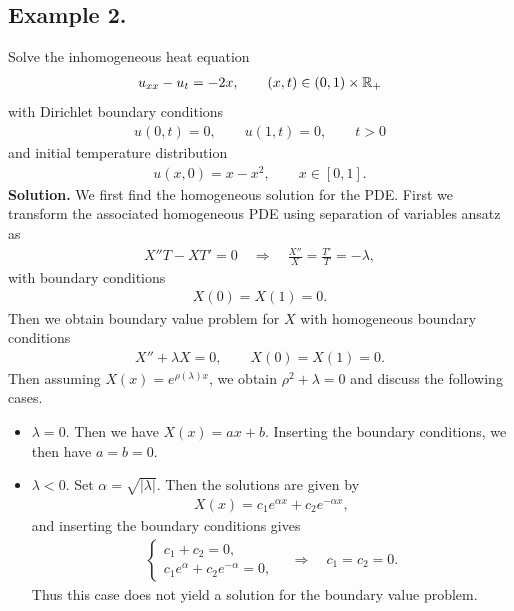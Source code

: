 \documentclass[12pt, a4paper]{article}
\begin{document}
\begin{spacing}{1.1}
\section*{Example 2.}

Solve the inhomogeneous heat equation
\begin{align*}
u_{xx} - u_t = -2x, \qquad (x, t)\in (0, 1)\times \mathbb{R}_{+}
\end{align*}
with Dirichlet boundary conditions
\begin{align*}
u(0, t) = 0, \qquad u(1, t) = 0, \qquad t > 0
\end{align*}
and initial temperature distribution
\begin{align*}
u(x, 0) = x - x^2, \qquad x\in [0, 1].
\end{align*}
\textbf{Solution.} We first find the homogeneous solution for the PDE. First we transform the associated homogeneous PDE using separation of variables ansatz as
\begin{align*}
X''T - XT' = 0\quad\Rightarrow\quad \frac{X''}{X} = \frac{T'}{T} = -\lambda,
\end{align*}
with boundary conditions
\begin{align*}
X(0) = X(1) = 0.
\end{align*}
Then we obtain boundary value problem for $X$ with homogeneous boundary conditions
\begin{align*}
X'' + \lambda X = 0,\qquad X(0) = X(1) = 0.
\end{align*}
Then assuming $X(x) = e^{\rho(\lambda)x}$, we obtain $\rho^2 + \lambda = 0$ and discuss the following cases.
\begin{itemize}
	\item \underline{$\lambda = 0$}. Then we have $X(x) = ax + b$. Inserting the boundary conditions, we then have $a = b = 0.$
	\item \underline{$\lambda < 0$}. Set $\alpha = \sqrt{|\lambda|}$. Then the solutions are given by
	\begin{align*}
	X(x) = c_1 e^{\alpha x} + c_2 e^{-\alpha x},
	\end{align*}
	and inserting the boundary conditions gives
	\begin{align*}
	\left\{
	\begin{array}{l}
	c_1 + c_2 = 0, \\
	c_1e^{\alpha} + c_2 e^{-\alpha} = 0,
	\end{array}
	\right. \quad\Rightarrow\quad c_1 = c_2 = 0.
	\end{align*}
	Thus this case does not yield a solution for the boundary value problem.

\end{itemize}
\end{spacing}
\end{document}

